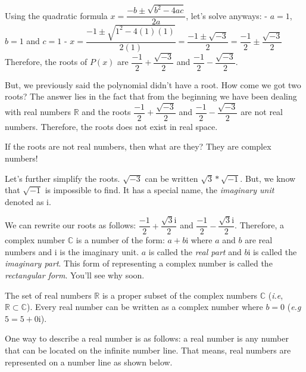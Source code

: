 \documentclass[11pt]{article}
\begin{document}
Using the quadratic formula \(x = \dfrac{-b \pm \sqrt{b^2 - 4ac}}{2a}\),
let's solve anyways: - \(a = 1\), \(b = 1\) and \(c = 1\) -
\(x = \dfrac{-1 \pm \sqrt{1^2 - 4(1)(1)}}{2(1)} = \dfrac{-1 \pm \sqrt{-3}}{2} = \dfrac{-1}{2} \pm \dfrac{\sqrt{-3}}{2}\)\\
Therefore, the roots of \(P(x)\) are
\(\dfrac{-1}{2} + \dfrac{\sqrt{-3}}{2}\) and
\(\dfrac{-1}{2} - \dfrac{\sqrt{-3}}{2}\).

But, we previously said the polynomial didn't have a root. How come we
got two roots? The answer lies in the fact that from the beginning we
have been dealing with real numbers \(\mathbb{R}\) and the roots
\(\dfrac{-1}{2} + \dfrac{\sqrt{-3}}{2}\) and
\(\dfrac{-1}{2} - \dfrac{\sqrt{-3}}{2}\) are not real numbers.
Therefore, the roots does not exist in real space.

If the roots are not real numbers, then what are they? They are complex
numbers!

Let's further simplify the roots. \(\sqrt{-3}\) can be written
\(\sqrt{3} * \sqrt{-1}\). But, we know that \(\sqrt{-1}\) is impossible
to find. It has a special name, the \emph{imaginary unit} denoted as
\(\mathrm{i}\).

We can rewrite our roots as follows:
\(\dfrac{-1}{2} + \dfrac{\sqrt{3}\mathrm{i}}{2}\) and
\(\dfrac{-1}{2} - \dfrac{\sqrt{3}\mathrm{i}}{2}\). Therefore, a complex
number \(\mathbb{C}\) is a number of the form: \(a + b\mathrm{i}\) where
\(a\) and \(b\) are real numbers and \(\mathrm{i}\) is the imaginary
unit. \(a\) is called the \emph{real part} and \(b\mathrm{i}\) is called
the \emph{imaginary part}. This form of representing a complex number is
called the \emph{rectangular form}. You'll see why soon.

The set of real numbers \(\mathbb{R}\) is a proper subset of the complex
numbers \(\mathbb{C}\) (\emph{i.e}, \(\mathbb{R} \subset \mathbb{C}\)).
Every real number can be written as a complex number where \(b = 0\)
(\emph{e.g} \(5 = 5 + 0\mathrm{i}\)).

One way to describe a real number is as follows: a real number is any
number that can be located on the infinite number line. That means, real
numbers are represented on a number line as shown below.

    \begin{center}
    \end{center}
    { \hspace*{\fill} \\}
    
\end{document}
